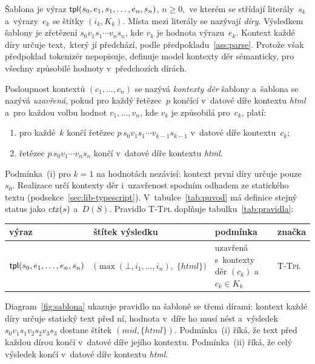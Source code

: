 Šablona je výraz $\mathsf{tpl}(s_0, e_1, s_1, \ldots, e_n, s_n)$, $n \ge 0$,~ve kterém se střídají literály~$s_k$ a~výrazy~$e_k$ se štítky $(i_k, K_k)$. Místa mezi literály se nazývají \emph{díry}. Výsledkem šablony je zřetězení $s_0 v_1 s_1 \cdots v_n s_n$, kde $v_k$ je hodnota výrazu~$e_k$. Kontext každé díry určuje text,~který jí předchází, podle předpokladu~\ref{ass:parse}. Protože však předpoklad tokenizér nepopisuje, definuje model kontexty děr sémanticky, pro všechny způsobilé hodnoty v~předchozích dírách.

\begin{definice}
\label{def:tpl}
Posloupnost kontextů $(c_1, \ldots, c_n)$ se nazývá \emph{kontexty děr} šablony a~šablona se nazývá \emph{uzavřená}, pokud pro každý řetězec~$p$ končící v~datové díře kontextu \emph{html} a~pro každou volbu hodnot $v_1, \ldots, v_n$, kde $v_k$ je způsobilá pro~$c_k$, platí:
\begin{enumerate}[label=(\roman*)]
    \item pro každé~$k$ končí řetězec $p\,s_0 v_1 s_1 \cdots v_{k-1} s_{k-1}$ v~datové díře kontextu~$c_k$;
    \item řetězec $p\,s_0 v_1 \cdots v_n s_n$ končí v~datové díře kontextu \emph{html}.
\end{enumerate}
\end{definice}

Podmínka~(i) pro $k = 1$ na hodnotách nezávisí: kontext první díry určuje pouze~$s_0$. Realizace určí kontexty děr i~uzavřenost spodním odhadem ze statického textu (podsekce~\ref{sec:lib-typescript}). V~tabulce~\ref{tab:puvod} má definice stejný status jako $\mathit{ctx}(s)$ a~$D(S)$. Pravidlo \textsc{T-Tpl} doplňuje tabulku~\ref{tab:pravidla}:

\begin{center}
    \footnotesize
    \begin{tabularx}{\textwidth}{@{}llYl@{}}
        \toprule
        \textbf{výraz} & \textbf{štítek výsledku} & \textbf{podmínka} & \textbf{značka} \\
        \midrule
        $\mathsf{tpl}(s_0, e_1, \ldots, e_n, s_n)$ & $\bigl(\max(\bot, i_1, \ldots, i_n),\; \{\mathit{html}\}\bigr)$ & uzavřená s~kontexty děr $(c_k)$ a~$c_k \in K_k$ & \textsc{T-Tpl} \\
        \bottomrule
    \end{tabularx}
\end{center}

Diagram~\ref{fig:sablona} ukazuje pravidlo na šabloně se třemi dírami: kontext každé díry určuje statický text před ní, hodnota v~díře ho musí nést a~výsledek $s_0 v_1 s_1 v_2 s_2 v_3 s_3$ dostane štítek $(\mathit{mid}, \{\mathit{html}\})$. Podmínka~(i) říká, že text před každou dírou končí v~datové díře jejího kontextu. Podmínka~(ii) říká, že celý výsledek končí v~datové díře kontextu \emph{html}.

